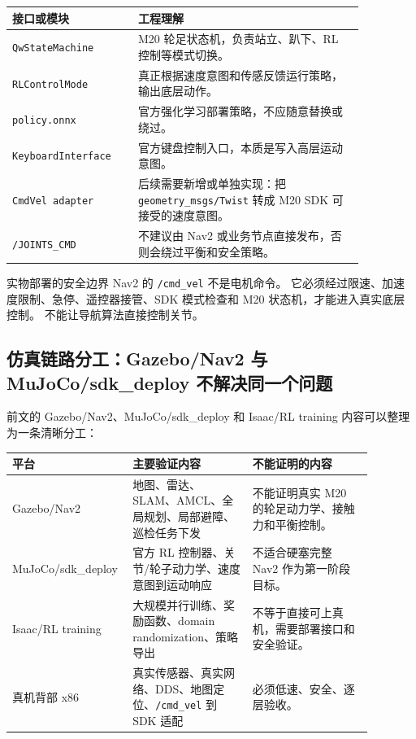 \documentclass[UTF8,11pt,a4paper]{ctexart}
\begin{document}
\begin{center}
\renewcommand{\arraystretch}{1.25}
\begin{tabular}{p{0.30\linewidth}p{0.56\linewidth}}
\toprule
\textbf{接口或模块} & \textbf{工程理解}\\
\midrule
\texttt{QwStateMachine} & M20 轮足状态机，负责站立、趴下、RL 控制等模式切换。\\
\texttt{RLControlMode} & 真正根据速度意图和传感反馈运行策略，输出底层动作。\\
\texttt{policy.onnx} & 官方强化学习部署策略，不应随意替换或绕过。\\
\texttt{KeyboardInterface} & 官方键盘控制入口，本质是写入高层运动意图。\\
\texttt{CmdVel adapter} & 后续需要新增或单独实现：把 \texttt{geometry\_msgs/Twist} 转成 M20 SDK 可接受的速度意图。\\
\texttt{/JOINTS\_CMD} & 不建议由 Nav2 或业务节点直接发布，否则会绕过平衡和安全策略。\\
\bottomrule
\end{tabular}
\end{center}

\begin{redbox}{实物部署的安全边界}
Nav2 的 \texttt{/cmd\_vel} 不是电机命令。
它必须经过限速、加速度限制、急停、遥控器接管、SDK 模式检查和 M20 状态机，才能进入真实底层控制。
不能让导航算法直接控制关节。
\end{redbox}

\subsection{仿真链路分工：Gazebo/Nav2 与 MuJoCo/sdk\_deploy 不解决同一个问题}

前文的 Gazebo/Nav2、MuJoCo/sdk\_deploy 和 Isaac/RL training 内容可以整理为一条清晰分工：

\begin{center}
\renewcommand{\arraystretch}{1.25}
\begin{tabular}{p{0.24\linewidth}p{0.32\linewidth}p{0.32\linewidth}}
\toprule
\textbf{平台} & \textbf{主要验证内容} & \textbf{不能证明的内容}\\
\midrule
Gazebo/Nav2 &
地图、雷达、SLAM、AMCL、全局规划、局部避障、巡检任务下发 &
不能证明真实 M20 的轮足动力学、接触力和平衡控制。\\
MuJoCo/sdk\_deploy &
官方 RL 控制器、关节/轮子动力学、速度意图到运动响应 &
不适合硬塞完整 Nav2 作为第一阶段目标。\\
Isaac/RL training &
大规模并行训练、奖励函数、domain randomization、策略导出 &
不等于直接可上真机，需要部署接口和安全验证。\\
真机背部 x86 &
真实传感器、真实网络、DDS、地图定位、\texttt{/cmd\_vel} 到 SDK 适配 &
必须低速、安全、逐层验收。\\
\bottomrule
\end{tabular}
\end{center}
\end{document}
